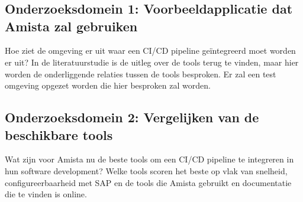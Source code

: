 
\chapter{}
\label{ch:methodologie}



\section{Onderzoeksdomein 1: Voorbeeldapplicatie dat Amista zal gebruiken}
\label{sec:onderzoeksdeel1}
Hoe ziet de omgeving er uit waar een CI/CD pipeline geïntegreerd moet worden er uit? In de literatuurstudie is de uitleg over de tools terug te vinden, maar hier worden de onderliggende relaties tussen de tools besproken.
Er zal een test omgeving opgezet worden die hier besproken zal worden. 


\section{Onderzoeksdomein 2: Vergelijken van de beschikbare tools}
\label{sec:onderzoeksdeel2}
Wat zijn voor Amista nu de beste tools om een CI/CD pipeline te integreren in hun software development? Welke tools scoren het beste op vlak van snelheid, configureerbaarheid met SAP en de tools die Amista gebruikt en documentatie die te vinden is online.